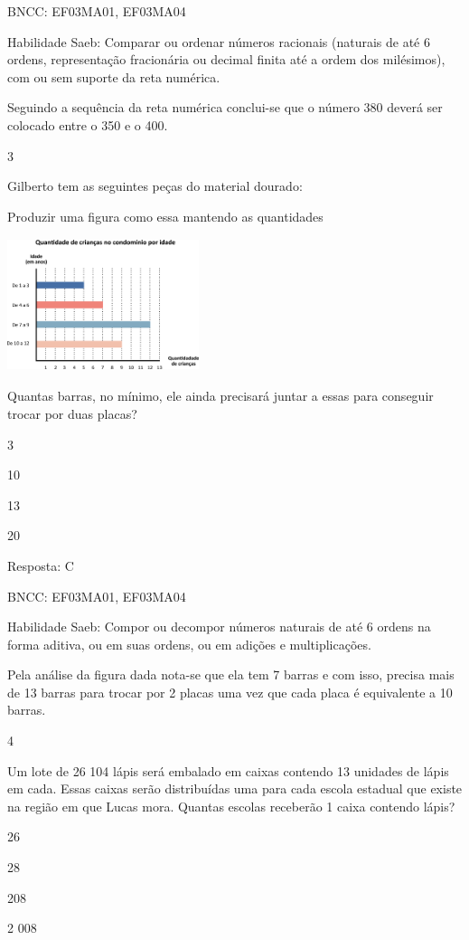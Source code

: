 \begin{escolha}
{\begin{escolha}
{BNCC: EF03MA01, EF03MA04

Habilidade Saeb: Comparar ou ordenar números racionais (naturais de até
6 ordens, representação fracionária ou decimal finita até a ordem dos
milésimos), com ou sem suporte da reta numérica.

Seguindo a sequência da reta numérica conclui-se que o número 380 deverá
ser colocado entre o 350 e o 400.

\num{3}

Gilberto tem as seguintes peças do material dourado:

Produzir uma figura como essa mantendo as quantidades

\includegraphics[width=2.20852in,height=1.52513in]{media/image118.png}

Quantas barras, no mínimo, ele ainda precisará juntar a essas para
conseguir trocar por duas placas?

\begin{escolha}
\item
  3
\item
  10
\item
  13
\item
  20
\end{escolha}

Resposta: C

BNCC: EF03MA01, EF03MA04

Habilidade Saeb: Compor ou decompor números naturais de até 6 ordens na
forma aditiva, ou em suas ordens, ou em adições e multiplicações.

Pela análise da figura dada nota-se que ela tem 7 barras e com isso,
precisa mais de 13 barras para trocar por 2 placas uma vez que cada
placa é equivalente a 10 barras.

\num{4}

Um lote de 26 104 lápis será embalado em caixas contendo 13 unidades de
lápis em cada. Essas caixas serão distribuídas uma para cada escola
estadual que existe na região em que Lucas mora. Quantas escolas
receberão 1 caixa contendo lápis?

\begin{escolha}
\item
  26
\item
  28
\item
  208
\item
  2 008
\end{escolha}

}
\end{escolha}}
\end{escolha}
